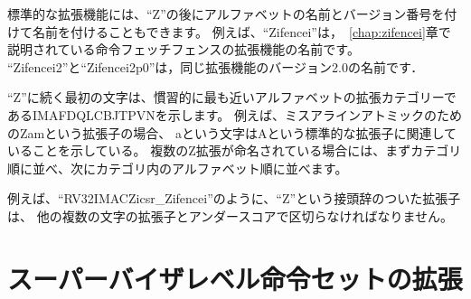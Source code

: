 \begin{comment}
Standard extensions can also be named using a single ``Z'' followed by an
alphabetical name and an optional version number.  For example,
``Zifencei'' names the instruction-fetch fence extension described in
Chapter~\ref{chap:zifencei}; ``Zifencei2'' and ``Zifencei2p0'' name version
2.0 of same.
\end{comment}
標準的な拡張機能には、``Z''の後にアルファベットの名前とバージョン番号を付けて名前を付けることもできます。
例えば、``Zifencei''は，~\ref{chap:zifencei}章で説明されている命令フェッチフェンスの拡張機能の名前です。
``Zifencei2''と``Zifencei2p0''は，同じ拡張機能のバージョン2.0の名前です．

\begin{comment}
The first letter following the ``Z'' conventionally indicates the most closely
related alphabetical extension category, IMAFDQLCBJTPVN.  For the ``Zam''
extension for misaligned atomics, for example, the letter ``a'' indicates the
extension is related to the ``A'' standard extension.  If multiple ``Z''
extensions are named, they should be ordered first by category, then
alphabetically within a category---for example, ``Zicsr\_Zifencei\_Zam''.
\end{comment}
``Z''に続く最初の文字は、慣習的に最も近いアルファベットの拡張カテゴリーであるIMAFDQLCBJTPVNを示します。
例えば、ミスアラインアトミックのためのZamという拡張子の場合、
aという文字はAという標準的な拡張子に関連していることを示している。
複数のZ拡張が命名されている場合には、まずカテゴリ順に並べ、次にカテゴリ内のアルファベット順に並べます。

\begin{comment}
Extensions with the ``Z'' prefix must be separated
from other multi-letter extensions by an underscore, e.g.,
``RV32IMACZicsr\_Zifencei''.
\end{comment}
例えば、``RV32IMACZicsr\_Zifencei''のように、``Z''という接頭辞のついた拡張子は、
他の複数の文字の拡張子とアンダースコアで区切らなければなりません。

\begin{comment}
\section{Supervisor-level Instruction-Set Extensions}
\end{comment}
\section{スーパーバイザレベル命令セットの拡張}

